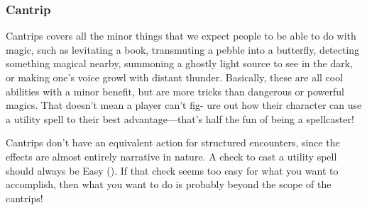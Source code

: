 \subsubsection{Cantrip}
Cantrips covers all the minor things that we expect
people to be able to do with magic, such as levitating a
book, transmuting a pebble into a butterfly, detecting
something magical nearby, summoning a ghostly light
source to see in the dark, or making one’s voice growl
with distant thunder. Basically, these are all cool abilities
with a minor benefit, but are more tricks than dangerous
or powerful magics. That doesn’t mean a player can't fig-
ure out how their character can use a utility spell to their
best advantage—that’s half the fun of being a spellcaster!

Cantrips don't have an equivalent action for
structured encounters, since the effects are almost
entirely narrative in nature. A check to cast a utility spell
should always be Easy (\difficulty). If that check seems too easy
for what you want to accomplish, then what you want to
do is probably beyond the scope of the cantrips!

